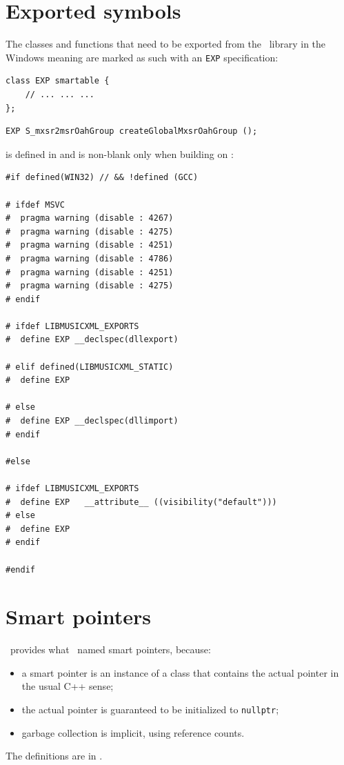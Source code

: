 \section{Exported symbols}

The classes and functions that need to be exported from the \mf\ library in the Windows meaning are marked as such with an {\tt EXP} specification:
\begin{lstlisting}[language=CPlusPlus]
class EXP smartable {
	// ... ... ...
};
\end{lstlisting}

\begin{lstlisting}[language=CPlusPlus]
EXP S_mxsr2msrOahGroup createGlobalMxsrOahGroup ();
\end{lstlisting}

 is defined in  and is non-blank only when building on \Windows:
\begin{lstlisting}[language=CPlusPlus]
#if defined(WIN32) // && !defined (GCC)

# ifdef MSVC
#  pragma warning (disable : 4267)
#  pragma warning (disable : 4275)
#  pragma warning (disable : 4251)
#  pragma warning (disable : 4786)
#  pragma warning (disable : 4251)
#  pragma warning (disable : 4275)
# endif

# ifdef LIBMUSICXML_EXPORTS
#  define EXP __declspec(dllexport)

# elif defined(LIBMUSICXML_STATIC)
#  define EXP

# else
#  define EXP __declspec(dllimport)
# endif

#else

# ifdef LIBMUSICXML_EXPORTS
#  define EXP	__attribute__ ((visibility("default")))
# else
#  define EXP
# endif

#endif
\end{lstlisting}


\section{Smart pointers}

\libmusicxml\ provides what \fober\ named smart pointers, because:
\begin{itemize}
\item a smart pointer is an instance of a class   that contains the actual pointer in the usual C++ sense;
\item the actual pointer is guaranteed to be initialized to {\tt nullptr};
\item garbage collection is implicit, using reference counts.
\end{itemize}
The definitions are in .

